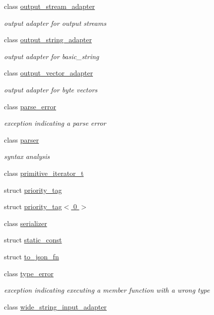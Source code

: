 \begin{DoxyCompactItemize}
class \hyperlink{classnlohmann_1_1detail_1_1output__stream__adapter}{output\+\_\+stream\+\_\+adapter}
\begin{DoxyCompactList}\small\item\em output adapter for output streams \end{DoxyCompactList}\item 
class \hyperlink{classnlohmann_1_1detail_1_1output__string__adapter}{output\+\_\+string\+\_\+adapter}
\begin{DoxyCompactList}\small\item\em output adapter for basic\+\_\+string \end{DoxyCompactList}\item 
class \hyperlink{classnlohmann_1_1detail_1_1output__vector__adapter}{output\+\_\+vector\+\_\+adapter}
\begin{DoxyCompactList}\small\item\em output adapter for byte vectors \end{DoxyCompactList}\item 
class \hyperlink{classnlohmann_1_1detail_1_1parse__error}{parse\+\_\+error}
\begin{DoxyCompactList}\small\item\em exception indicating a parse error \end{DoxyCompactList}\item 
class \hyperlink{classnlohmann_1_1detail_1_1parser}{parser}
\begin{DoxyCompactList}\small\item\em syntax analysis \end{DoxyCompactList}\item 
class \hyperlink{classnlohmann_1_1detail_1_1primitive__iterator__t}{primitive\+\_\+iterator\+\_\+t}
\item 
struct \hyperlink{structnlohmann_1_1detail_1_1priority__tag}{priority\+\_\+tag}
\item 
struct \hyperlink{structnlohmann_1_1detail_1_1priority__tag_3_010_01_4}{priority\+\_\+tag$<$ 0 $>$}
\item 
class \hyperlink{classnlohmann_1_1detail_1_1serializer}{serializer}
\item 
struct \hyperlink{structnlohmann_1_1detail_1_1static__const}{static\+\_\+const}
\item 
struct \hyperlink{structnlohmann_1_1detail_1_1to__json__fn}{to\+\_\+json\+\_\+fn}
\item 
class \hyperlink{classnlohmann_1_1detail_1_1type__error}{type\+\_\+error}
\begin{DoxyCompactList}\small\item\em exception indicating executing a member function with a wrong type \end{DoxyCompactList}\item 
class \hyperlink{classnlohmann_1_1detail_1_1wide__string__input__adapter}{wide\+\_\+string\+\_\+input\+\_\+adapter}
\end{DoxyCompactItemize}
